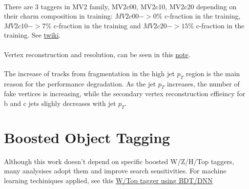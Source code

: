 \paragraph{}
There are 3 taggers in MV2 family, MV2c00, MV2c10, MV2c20 depending on their charm composition in training: $MV2c00->0\%$ c-fraction in the training, $MV2c10->7\%$ c-fraction in the training and $MV2c20->15\%$ c-fraction in the training. See \href{https://twiki.cern.ch/twiki/bin/view/AtlasProtected/BTaggingMV2}{twiki}.

\paragraph{}
Vertex reconstruction and resolution, can be seen in this \href{http://atlas.web.cern.ch/Atlas/GROUPS/PHYSICS/PUBNOTES/ATL-PHYS-PUB-2015-026/}{note}.


\paragraph{}
The increase of tracks from fragmentation in the high jet $p_T$ region is the main reason for the performance degradation. As the jet $p_T$ increases, the number of fake vertices is increasing, while the secondary vertex reconstruction effieincy for b and c jets slighly decreases with jet $p_T$.


\section{Boosted Object Tagging}
\paragraph{}
Although this work doesn't depend on specific boosted W/Z/H/Top taggers, many analysises adopt them and improve search sensitivities. For machine learning techiniques applied, see this \href{https://cds.cern.ch/record/2242830/files/ATL-COM-PHYS-2017-031.pdf}{W/Top tagger using BDT/DNN}

